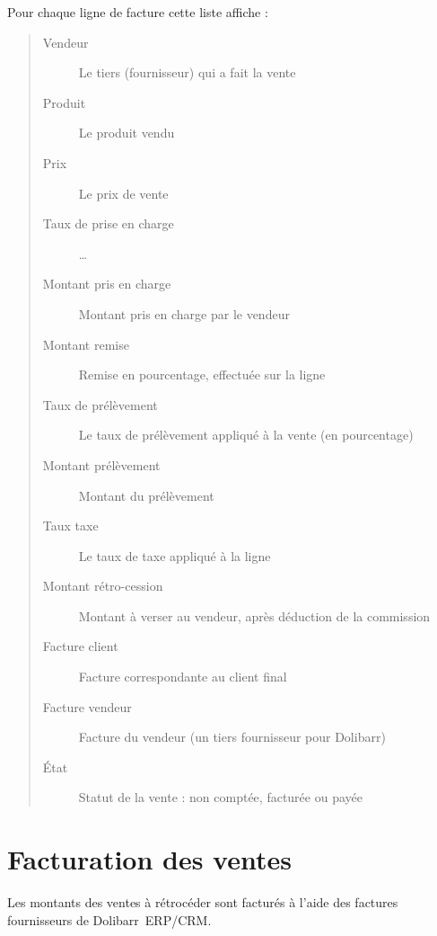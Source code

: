 \documentclass[letterpaper,10pt,english]{sphinxmanual}
\begin{document}
Pour chaque ligne de facture cette liste affiche :
\begin{quote}
\begin{description}
\item[{Vendeur}] \leavevmode
Le tiers (fournisseur) qui a fait la vente

\item[{Produit}] \leavevmode
Le produit vendu

\item[{Prix}] \leavevmode
Le prix de vente

\item[{Taux de prise en charge}] \leavevmode
…

\item[{Montant pris en charge}] \leavevmode
Montant pris en charge par le vendeur

\item[{Montant remise}] \leavevmode
Remise en pourcentage, effectuée sur la ligne

\item[{Taux de prélèvement}] \leavevmode
Le taux de prélèvement appliqué à la vente (en pourcentage)

\item[{Montant prélèvement}] \leavevmode
Montant du prélèvement

\item[{Taux taxe}] \leavevmode
Le taux de taxe appliqué à la ligne

\item[{Montant rétro-cession}] \leavevmode
Montant à verser au vendeur, après déduction de la commission

\item[{Facture client}] \leavevmode
Facture correspondante au client final

\item[{Facture vendeur}] \leavevmode
Facture du vendeur  (un tiers fournisseur pour Dolibarr)

\item[{État}] \leavevmode
Statut de la vente : non comptée, facturée ou payée

\end{description}
\end{quote}


\section{Facturation des ventes}
\label{\detokenize{ventes:facturation-des-ventes}}
Les montants des ventes à rétrocéder sont facturés à l'aide des factures fournisseurs de Dolibarr ERP/CRM.
\end{document}
